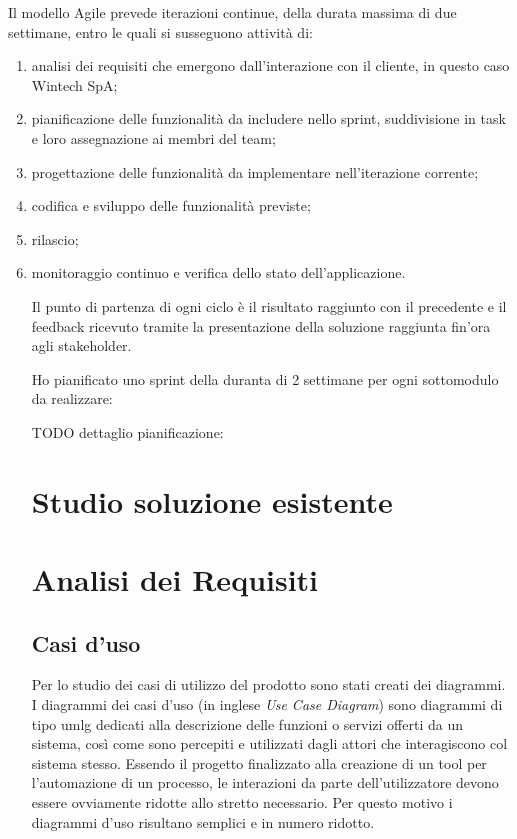 	Il modello Agile prevede iterazioni continue, della durata massima di due settimane,
	entro le quali si susseguono attività di:
	\begin{enumerate}
		\item analisi dei requisiti che emergono dall’interazione con il cliente, in questo caso Wintech SpA;
		\item pianificazione delle funzionalità da includere nello sprint, suddivisione in task e loro assegnazione ai membri del team;
		\item progettazione delle funzionalità da implementare nell’iterazione corrente;
		\item codifica e sviluppo delle funzionalità previste;
		\item rilascio;
		\item monitoraggio continuo e verifica dello stato dell’applicazione.
		
	Il punto di partenza di ogni ciclo è il risultato raggiunto con il precedente e il feedback
	ricevuto tramite la presentazione della soluzione raggiunta fin’ora agli stakeholder.
	
	Ho pianificato uno sprint della duranta di 2 settimane per ogni sottomodulo da realizzare:

	TODO dettaglio pianificazione:
			

\section{Studio soluzione esistente}
	

\section{Analisi dei Requisiti}

	\subsection{Casi d'uso}
	
	Per lo studio dei casi di utilizzo del prodotto sono stati creati dei diagrammi.
	I diagrammi dei casi d'uso (in inglese \emph{Use Case Diagram}) sono diagrammi di tipo \gls{umlg} dedicati alla descrizione delle funzioni o servizi offerti da un sistema, così come sono percepiti e utilizzati dagli attori che interagiscono col sistema stesso.
	Essendo il progetto finalizzato alla creazione di un tool per l'automazione di un processo, le interazioni da parte dell'utilizzatore devono essere ovviamente ridotte allo stretto necessario. Per questo motivo i diagrammi d'uso risultano semplici e in numero ridotto.
	

\end{enumerate}
